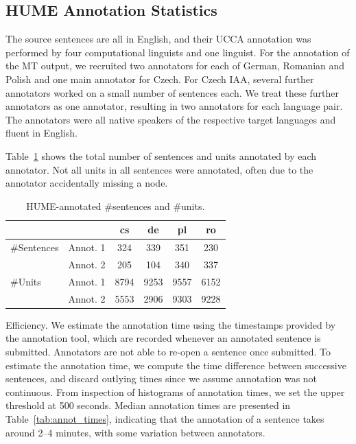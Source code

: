 \documentclass[11pt,letterpaper]{article}
\makeatletter
\renewcommand{\paragraph}{
  \@startsection{paragraph}{4}
  {\z@}{.1ex \@plus .1ex \@minus .1ex}{-1.5em}
  {\normalfont\normalsize\bfseries}
}
\newcommand{\tabref}[1]{Table~\ref{#1}}
\newcommand{\oa}[1]{}
\makeatother
\begin{document}
\subsection{HUME Annotation Statistics}
\label{sec:annot_stats}

The source sentences are all in English, and their UCCA annotation was performed by four
computational linguists and one linguist.
For the annotation of the MT output, we recruited two annotators for each of German, Romanian
and Polish and one main annotator for Czech. For Czech IAA,
several further annotators worked on a small number of 
sentences each. We treat these further annotators as one annotator, resulting in two annotators
for each language pair.
The annotators were all native speakers of the respective target languages and fluent in English.
\oa{maybe we should put in what training they've received}

\tabref{tab:annot}
shows the total number of sentences and units annotated by each annotator.
Not all units in all sentences were annotated, often due to
the annotator %
accidentally missing a node.
\begin{table}
\begin{center}
{\small
\begin{tabular}{ll|cccc}
& & cs & de & pl & ro \\
\hline
\#Sentences &  Annot. 1 & 324   & 339  & 351  & 230  \\
 & Annot. 2 & 205 & 104  & 340  & 337 \\
\hline
\#Units & Annot. 1 & 8794  & 9253 & 9557  & 6152 \\
 &Annot. 2 & 5553 & 2906  & 9303  & 9228  \\
\end{tabular}
\caption{HUME-annotated \#sentences and \#units.}
\label{tab:annot}
}
\end{center}
\end{table}

\paragraph{Efficiency.}
We estimate the annotation time using the timestamps
provided by the annotation tool, which are recorded whenever an annotated sentence is
submitted. Annotators are not able to re-open a sentence once submitted. 
To estimate the annotation time, we compute the time difference between successive 
sentences, and discard outlying times since we assume annotation was not continuous.
From inspection of histograms of annotation times, we set the upper threshold at 500 seconds.
Median annotation times are presented in Table~\ref{tab:annot_times},
indicating that the annotation
of a sentence takes around 2--4 minutes, with some variation between annotators.
\end{document}
